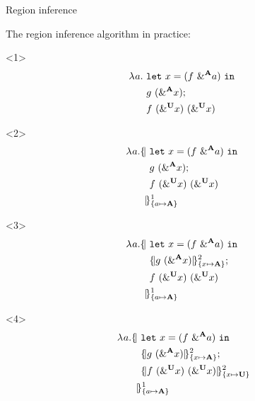 \documentclass[aspectratio=169,dvipsnames,svgnames,10pt]{beamer}
\begin{document}
\begin{frame}[fragile]{Region inference}

  The region inference algorithm in practice:
  \setlength{\jot}{-1pt}
  \begin{onlyenv}<1>
    \begin{align*}
      \lam{a}{}\ %
      &\letin{x}{\app{f}{\borrow[\kaff]{a}}}{}\\
      &g\ (\borrow[\kaff]{x});\\
      &f\ (\borrow[\kun]{x})\ (\borrow[\kun]{x})\\
    \end{align*}
  \end{onlyenv}
  \begin{onlyenv}<2>
    \begin{align*}
      \lam{a}{}\region[1]{\Sone a\MBORROW}{\ %
      &\letin{x}{\app{f}{\borrow[\kaff]{a}}}{}\\
      &g\ (\borrow[\kaff]{x});\\
      &f\ (\borrow[\kun]{x})\ (\borrow[\kun]{x})\\
      &\!\!\!}
    \end{align*}
  \end{onlyenv}
  \begin{onlyenv}<3>
    \begin{align*}
      \lam{a}{}\region[1]{\Sone a\MBORROW}{\ %
      &\letin{x}{\app{f}{\borrow[\kaff]{a}}}{}\\
      &\region[2]{\Sone x\MBORROW}{g\ (\borrow[\kaff]{x})};\\
      &f\ (\borrow[\kun]{x})\ (\borrow[\kun]{x})\\
      &\!\!\!}
    \end{align*}
  \end{onlyenv}
  \begin{onlyenv}<4>
    \begin{align*}
      \lam{a}{}\region[1]{\Sone a\MBORROW}{\ %
      &\letin{x}{\app{f}{\borrow[\kaff]{a}}}{}\\
      &\region[2]{\Sone x\MBORROW}{g\ (\borrow[\kaff]{x})};\\
      &\region[2]{\Sone x\IBORROW}{f\ (\borrow[\kun]{x})\ (\borrow[\kun]{x})}\\
      &\!\!\!}
    \end{align*}
  \end{onlyenv}
\end{frame}
\end{document}
